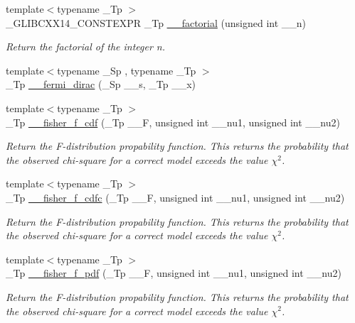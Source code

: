 \begin{DoxyCompactItemize}
{\footnotesize template$<$typename \+\_\+\+Tp $>$ }\\\+\_\+\+G\+L\+I\+B\+C\+X\+X14\+\_\+\+C\+O\+N\+S\+T\+E\+X\+PR \+\_\+\+Tp \hyperlink{namespacestd_1_1____detail_a8de5d6069cbef126684be0800f47f8b2}{\+\_\+\+\_\+factorial} (unsigned int \+\_\+\+\_\+n)
\begin{DoxyCompactList}\small\item\em Return the factorial of the integer n. \end{DoxyCompactList}\item 
{\footnotesize template$<$typename \+\_\+\+Sp , typename \+\_\+\+Tp $>$ }\\\+\_\+\+Tp \hyperlink{namespacestd_1_1____detail_a470e563c4e88c433f94dca391814dc61}{\+\_\+\+\_\+fermi\+\_\+dirac} (\+\_\+\+Sp \+\_\+\+\_\+s, \+\_\+\+Tp \+\_\+\+\_\+x)
\item 
{\footnotesize template$<$typename \+\_\+\+Tp $>$ }\\\+\_\+\+Tp \hyperlink{namespacestd_1_1____detail_a3825f4b63cdd255c1ca790bf16d844a1}{\+\_\+\+\_\+fisher\+\_\+f\+\_\+cdf} (\+\_\+\+Tp \+\_\+\+\_\+F, unsigned int \+\_\+\+\_\+nu1, unsigned int \+\_\+\+\_\+nu2)
\begin{DoxyCompactList}\small\item\em Return the F-\/distribution propability function. This returns the probability that the observed chi-\/square for a correct model exceeds the value $ \chi^2 $. \end{DoxyCompactList}\item 
{\footnotesize template$<$typename \+\_\+\+Tp $>$ }\\\+\_\+\+Tp \hyperlink{namespacestd_1_1____detail_ae02418cde6461a9e65f926c974c216a2}{\+\_\+\+\_\+fisher\+\_\+f\+\_\+cdfc} (\+\_\+\+Tp \+\_\+\+\_\+F, unsigned int \+\_\+\+\_\+nu1, unsigned int \+\_\+\+\_\+nu2)
\begin{DoxyCompactList}\small\item\em Return the F-\/distribution propability function. This returns the probability that the observed chi-\/square for a correct model exceeds the value $ \chi^2 $. \end{DoxyCompactList}\item 
{\footnotesize template$<$typename \+\_\+\+Tp $>$ }\\\+\_\+\+Tp \hyperlink{namespacestd_1_1____detail_a2f85415264800034e969f86ac8294f7b}{\+\_\+\+\_\+fisher\+\_\+f\+\_\+pdf} (\+\_\+\+Tp \+\_\+\+\_\+F, unsigned int \+\_\+\+\_\+nu1, unsigned int \+\_\+\+\_\+nu2)
\begin{DoxyCompactList}\small\item\em Return the F-\/distribution propability function. This returns the probability that the observed chi-\/square for a correct model exceeds the value $ \chi^2 $. \end{DoxyCompactList}\item 

\end{DoxyCompactItemize}
